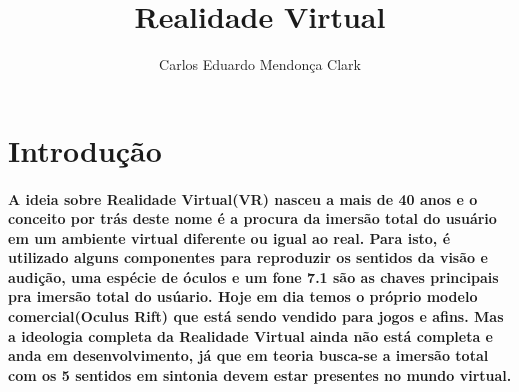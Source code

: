 \documentclass{paper}
\title{Realidade Virtual}
\author{Carlos Eduardo Mendonça Clark}
\begin{document}
\maketitle

\section{Introdução} 
  \paragraph{       A ideia sobre Realidade Virtual(VR) nasceu a mais de 40 anos e o conceito por trás deste nome é a procura da imersão total do usuário em um ambiente virtual diferente ou igual ao real. Para isto, é utilizado alguns componentes para reproduzir os sentidos da visão e audição, uma espécie de óculos e um fone 7.1 são as chaves principais pra imersão total do usúario. Hoje em dia temos o próprio modelo comercial(Oculus Rift) que está sendo vendido para jogos e afins. Mas a ideologia completa da Realidade Virtual ainda não está completa e anda em desenvolvimento, já que em teoria busca-se a imersão total com os 5 sentidos em sintonia devem estar presentes no mundo virtual.}
\end{document}
